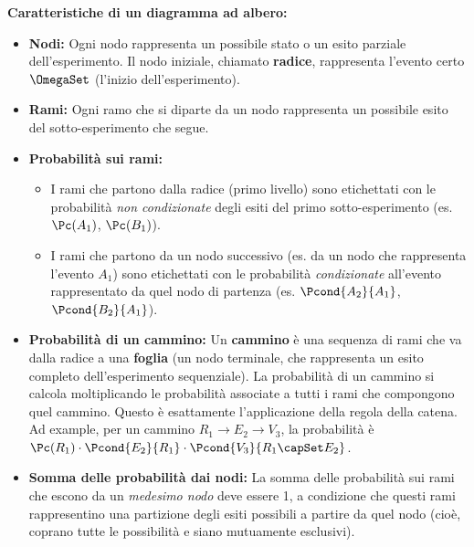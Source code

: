 \textbf{Caratteristiche di un diagramma ad albero:}
\begin{itemize}
    \item \textbf{Nodi:} Ogni nodo rappresenta un possibile stato o un esito parziale dell'esperimento. Il nodo iniziale, chiamato \textbf{radice}, rappresenta l'evento certo $\OmegaSet$ (l'inizio dell'esperimento).
    \item \textbf{Rami:} Ogni ramo che si diparte da un nodo rappresenta un possibile esito del sotto-esperimento che segue.
    \item \textbf{Probabilità sui rami:}
        \begin{itemize}
            \item I rami che partono dalla radice (primo livello) sono etichettati con le probabilità \textit{non condizionate} degli esiti del primo sotto-esperimento (es. $\Pc(A_1)$, $\Pc(B_1)$).
            \item I rami che partono da un nodo successivo (es. da un nodo che rappresenta l'evento $A_1$) sono etichettati con le probabilità \textit{condizionate} all'evento rappresentato da quel nodo di partenza (es. $\Pcond{A_2}{A_1}$, $\Pcond{B_2}{A_1}$).
        \end{itemize}
    \item \textbf{Probabilità di un cammino:} Un \textbf{cammino} è una sequenza di rami che va dalla radice a una \textbf{foglia} (un nodo terminale, che rappresenta un esito completo dell'esperimento sequenziale). La probabilità di un cammino si calcola moltiplicando le probabilità associate a tutti i rami che compongono quel cammino. Questo è esattamente l'applicazione della regola della catena. Ad example, per un cammino $R_1 \rightarrow E_2 \rightarrow V_3$, la probabilità è $\Pc(R_1) \cdot \Pcond{E_2}{R_1} \cdot \Pcond{V_3}{R_1 \capSet E_2}$.
    \item \textbf{Somma delle probabilità dai nodi:} La somma delle probabilità sui rami che escono da un \textit{medesimo nodo} deve essere 1, a condizione che questi rami rappresentino una partizione degli esiti possibili a partire da quel nodo (cioè, coprano tutte le possibilità e siano mutuamente esclusivi).
\end{itemize}

